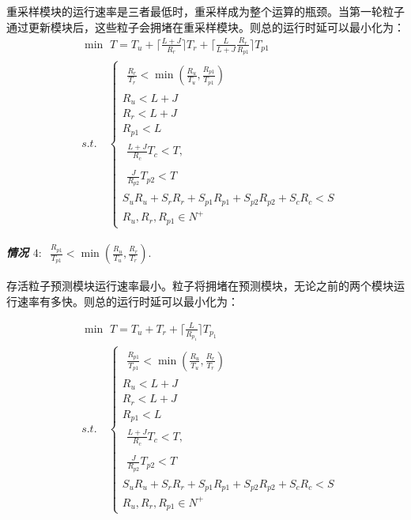重采样模块的运行速率是三者最低时，重采样成为整个运算的瓶颈。当第一轮粒子通过更新模块后，这些粒子会拥堵在重采样模块。则总的运行时延可以最小化为：
\begin{equation}\label{Eq:10}
\begin{split}
&\min \,\, T=T_u+\lceil \frac {L+J}{R_r}\rceil T_r+\lceil\frac{L}{L+J}\frac{R_r}{R_{p1}}\rceil T_{p1}\\
&s.t.\quad  \left\{\begin{array}{l}
\begin{aligned}\frac{R_{r}}{T_{r}}< \min\left( \frac{R_{u}}{T_{u}},\frac{R_{p1}}{T_{p1}}\right)\end{aligned} \\
R_{u}<L+J\\
R_{r}<L+J\\
R_{p1}<L \\
\begin{split} \frac{L+J}{R_c}T_c<T,\end{split}\\
\begin{split}\frac{J}{R_{p2}}T_{p2}<T\end{split}\\
S_uR_{u}+S_rR_{r}+S_{p1}R_{p1}+S_{p2}R_{p2}+S_cR_{c}<S\\
R_{u},R_{r},R_{p1}\in N^+ \end{array}\right.\end{split}
\end{equation}

\textbf{\emph{情况 $4$}}: $\begin{aligned}\frac{R_{p1}}{T_{p1}}<\min\left(\frac{R_{u}}{T_{u}},\frac{R_{r}}{T_{r}}\right).\end{aligned}$

存活粒子预测模块运行速率最小。粒子将拥堵在预测模块，无论之前的两个模块运行速率有多快。则总的运行时延可以最小化为：

\begin{equation}\label{Eq:11}
\begin{split}
&\min \,\, T=T_{u}+T_{r}+\lceil\frac{L}{R_{p_1}}\rceil T_{p_1}\\
&s.t.\quad  \left\{\begin{array}{l}
\begin{aligned}\frac{R_{p1}}{T_{p1}}<\min\left(\frac{R_{u}}{T_{u}},\frac{R_{r}}{T_{r}}\right)\end{aligned} \\
R_{u}<L+J\\
R_{r}<L+J\\
R_{p1}<L \\
\begin{split}\frac{L+J}{R_c}T_c<T,\end{split}\\
\begin{split}\frac{J}{R_{p2}}T_{p2}<T\end{split}\\
S_uR_{u}+S_rR_{r}+S_{p1}R_{p1}+S_{p2}R_{p2}+S_cR_{c}<S\\
R_{u},R_{r},R_{p1}\in N^+ \end{array}\right.
\end{split}
\end{equation}

